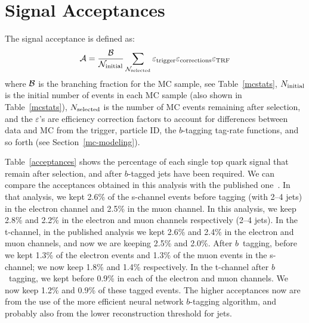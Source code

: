 %
\section{Signal Acceptances}
\label{signal-acceptances}

The signal acceptance is defined as:
$$
\cal{A} = \frac{\cal{B}}{N_{\rm initial}}
\displaystyle \sum_{N_{\rm selected}} \varepsilon_{\rm trigger}
\varepsilon_{\rm corrections} \varepsilon_{\rm TRF}
$$
\noindent where $\cal{B}$ is the branching fraction for the MC
sample, see Table~\ref{mcstats}, $N_{\rm initial}$ is the initial
number of events in each MC sample (also shown in
Table~\ref{mcstats}), $N_{\rm selected}$ is the number of MC events
remaining after selection, and the $\varepsilon$'s are efficiency
correction factors to account for differences between data and MC from
the trigger, particle ID, the $b$-tagging tag-rate functions, and so
forth (see Section~\ref{mc-modeling}).

Table~\ref{acceptances} shows the percentage of each single top quark
signal that remain after selection, and after $b$-tagged jets have
been required. We can compare the acceptances obtained in this
analysis with the published one~\cite{run2-d0-plb}. In that analysis,
we kept 2.6\% of the s-channel events before tagging (with 2--4 jets)
in the electron channel and 2.5\% in the muon channel. In this
analysis, we keep 2.8\% and 2.2\% in the electron and muon channels
respectively (2--4 jets). In the t-channel, in the published analysis
we kept 2.6\% and 2.4\% in the electron and muon channels, and now we
are keeping 2.5\% and 2.0\%. After $b$~tagging, before we kept 1.3\%
of the electron events and 1.3\% of the muon events in the s-channel;
we now keep 1.8\% and 1.4\% respectively. In the t-channel after
$b$~tagging, we kept before 0.9\% in each of the electron and muon
channels. We now keep 1.2\% and 0.9\% of these tagged events.  The
higher acceptances now are from the use of the more efficient neural
network $b$-tagging algorithm, and probably also from the lower
reconstruction threshold for jets.

%

